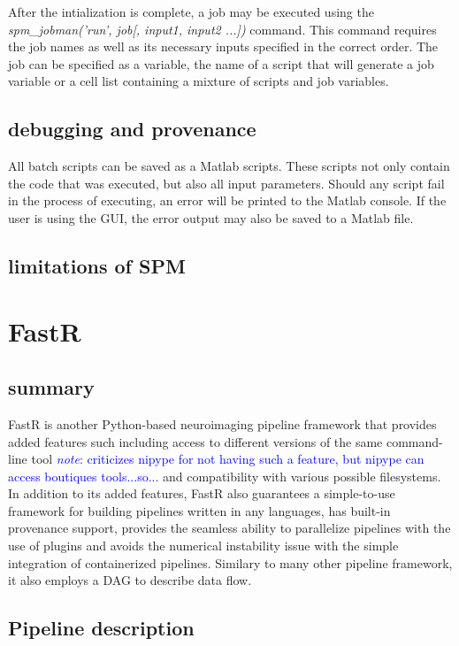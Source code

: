 \documentclass{report}
\newcommand{\note}[1]{\textcolor{blue}{\textit{note}: #1}}
\begin{document}
        After the intialization is complete, a job may be executed using the
        \textit{spm\_jobman(’run’, job[, input1, input2 ...])} command. This
        command requires the job names as well as its necessary inputs specified
        in the correct order. The job can be specified as a variable, the name
        of a script that will generate a job variable or a cell list containing
        a mixture of scripts and job variables. 
         
        \subsection{debugging and provenance} All batch scripts can be saved as
        a Matlab scripts. These scripts not only contain the code that was
        executed, but also all input parameters. Should any script fail in the
        process of executing, an error will be printed to the Matlab console. If
        the user is using the GUI, the error output may also be saved to a
        Matlab file.
    
        \subsection{limitations of SPM}
    

    \section{FastR} \subsection{summary} FastR is another Python-based
    neuroimaging pipeline framework that provides added features such including
    access to different versions of the same command-line tool \note{criticizes
    nipype for not having such a feature, but nipype can access boutiques
    tools...so...} and compatibility with various possible filesystems. In
    addition to its added features, FastR also guarantees a simple-to-use
    framework for building pipelines written in any languages, has built-in
    provenance support, provides the seamless ability to parallelize pipelines
    with the use of plugins and avoids the numerical instability issue with the
    simple integration of containerized pipelines. Similary to many other
    pipeline framework, it also employs a DAG to describe data flow.
 
        \subsection{Pipeline description}
\end{document}
